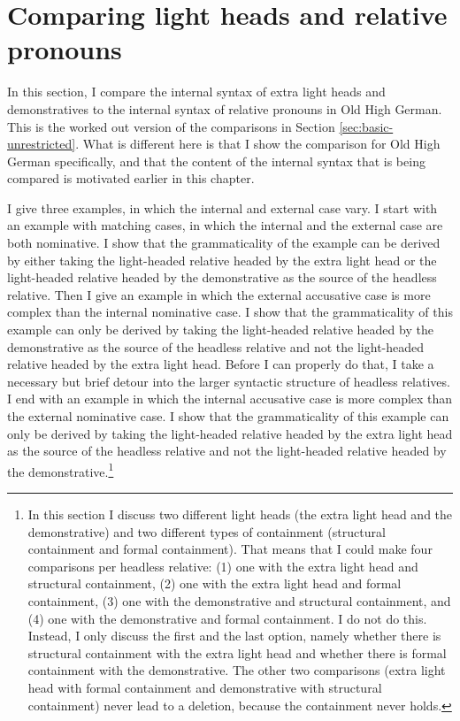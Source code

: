 \section{Comparing light heads and relative pronouns}\label{sec:comparing-ohg}

In this section, I compare the internal syntax of extra light heads and demonstratives to the internal syntax of relative pronouns in Old High German. This is the worked out version of the comparisons in Section \ref{sec:basic-unrestricted}. What is different here is that I show the comparison for Old High German specifically, and that the content of the internal syntax that is being compared is motivated earlier in this chapter.

I give three examples, in which the internal and external case vary.
I start with an example with matching cases, in which the internal and the external case are both nominative. I show that the grammaticality of the example can be derived by either taking the light-headed relative headed by the extra light head or the light-headed relative headed by the demonstrative as the source of the headless relative.
Then I give an example in which the external accusative case is more complex than the internal nominative case. I show that the grammaticality of this example can only be derived by taking the light-headed relative headed by the demonstrative as the source of the headless relative and not the light-headed relative headed by the extra light head. Before I can properly do that, I take a necessary but brief detour into the larger syntactic structure of headless relatives.
I end with an example in which the internal accusative case is more complex than the external nominative case. I show that the grammaticality of this example can only be derived by taking the light-headed relative headed by the extra light head as the source of the headless relative and not the light-headed relative headed by the demonstrative.\footnote{
In this section I discuss two different light heads (the extra light head and the demonstrative) and two different types of containment (structural containment and formal containment). That means that I could make four comparisons per headless relative: (1) one with the extra light head and structural containment, (2) one with the extra light head and formal containment, (3) one with the demonstrative and structural containment, and (4) one with the demonstrative and formal containment. I do not do this. Instead, I only discuss the first and the last option, namely whether there is structural containment with the extra light head and whether there is formal containment with the demonstrative. The other two comparisons (extra light head with formal containment and demonstrative with structural containment) never lead to a deletion, because the containment never holds.
}

